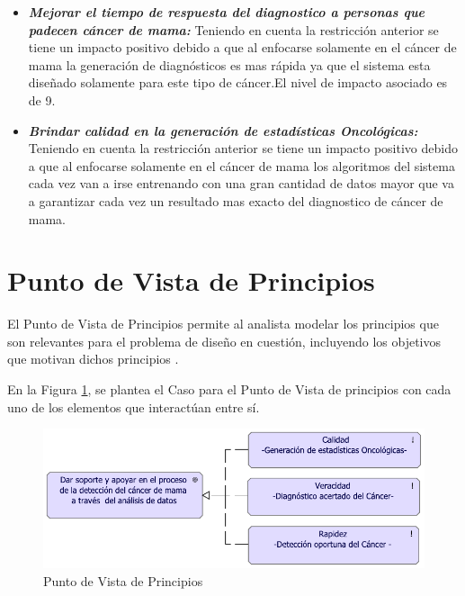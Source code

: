 \begin{enumerate}[label=\textbf{\arabic*})]
	\begin{itemize}
		\item  \textbf{\textit{Mejorar el tiempo de respuesta del diagnostico a personas que padecen cáncer de mama:}} Teniendo en cuenta la restricción anterior se tiene un impacto positivo debido a que al enfocarse solamente en el cáncer de mama la generación de diagnósticos es mas rápida ya que el sistema esta diseñado solamente para este tipo de cáncer.El nivel de impacto asociado es de 9.
		
		\item  \textbf{\textit{Brindar calidad en la generación de estadísticas Oncológicas:}} Teniendo en cuenta la restricción anterior se tiene un impacto positivo debido a que al enfocarse solamente en el cáncer de mama los algoritmos del sistema cada vez van a irse entrenando con una gran cantidad de datos mayor que va a garantizar cada vez un resultado mas exacto del diagnostico de cáncer de mama. 
	\end{itemize}

\end{enumerate}

\newpage
\section{Punto de Vista de Principios}

El Punto de Vista de Principios permite al analista modelar los principios que son relevantes para el problema de diseño en cuestión, incluyendo los objetivos que motivan dichos principios \cite{BolanosCastro2019}. 

En la Figura \ref{PvPrincipios}, se plantea el Caso para el Punto de Vista de principios con cada uno de los elementos que interactúan entre sí. 

\begin{figure}[h!]
	\centering
	\includegraphics[width=1\linewidth]{ARQUITECTURA/imgs/CapaMotivacion/4_PvPrincipios}
	\caption{Punto de Vista de Principios}
	\label{PvPrincipios}
\end{figure}

